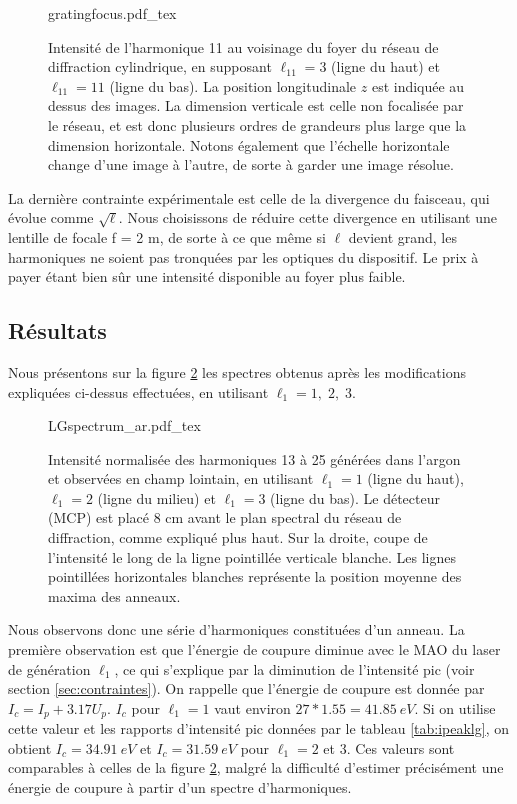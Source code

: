 \begin{figure}[!ht]
\centering
\def\svgwidth{1.1\columnwidth}
{gratingfocus.pdf_tex}
\caption{Intensité de l'harmonique 11 au voisinage du foyer du réseau de diffraction cylindrique, en supposant $\ell_{11} = 3$ (ligne du haut) et $\ell_{11} = 11$ (ligne du bas). La position longitudinale $z$ est indiquée au dessus des images. La dimension verticale est celle non focalisée par le réseau, et est donc plusieurs ordres de grandeurs plus large que la dimension horizontale. Notons également que l'échelle horizontale change d'une image à l'autre, de sorte à garder une image résolue.}
\label{Fig:gratingfocus}
\end{figure}

La dernière contrainte expérimentale est celle de la divergence du faisceau, qui évolue comme $\sqrt{\ell}$. Nous choisissons de réduire cette divergence en utilisant une lentille de focale f = 2 m, de sorte à ce que même si $\ell$ devient grand, les harmoniques ne soient pas tronquées par les optiques du dispositif. Le prix à payer étant bien sûr une intensité disponible au foyer plus faible. 

\subsection{Résultats}
\label{sec:results_lg}
Nous présentons sur la figure \ref{Fig:LGSpectrumAr} les spectres obtenus après les modifications expliquées ci-dessus effectuées, en utilisant $\ell_{1} = 1,\;2,\;3$. 

\begin{figure}[!ht]
\centering
\def\svgwidth{1\columnwidth}
{LGspectrum_ar.pdf_tex}
\caption{Intensité normalisée des harmoniques 13 à 25 générées dans l'argon et observées en champ lointain, en utilisant $\ell_{1} = 1$ (ligne du haut), $\ell_{1} = 2$ (ligne du milieu) et $\ell_{1} = 3$ (ligne du bas). Le détecteur (MCP) est placé 8 cm avant le plan spectral du réseau de diffraction, comme expliqué plus haut. Sur la droite, coupe de l'intensité le long de la ligne pointillée verticale blanche. Les lignes pointillées horizontales blanches représente la position moyenne des maxima des anneaux.}
\label{Fig:LGSpectrumAr}
\end{figure}

Nous observons donc une série d'harmoniques constituées d'un anneau. La première observation est que l'énergie de coupure diminue avec le MAO du laser de génération $\ell_{1}$, ce qui s'explique par la diminution de l'intensité pic (voir section \ref{sec:contraintes}). On rappelle que l'énergie de coupure est donnée par $I_c = I_p+3.17U_p$. $I_c$ pour $\ell_{1} = 1$ vaut environ $27*1.55=\SI{41.85}{eV}$. Si on utilise cette valeur et les rapports d'intensité pic données par le tableau \ref{tab:ipeaklg}, on obtient $I_c=\SI{34.91}{eV}$ et $I_c=\SI{31.59}{eV}$ pour $\ell_{1} = 2$ et 3. Ces valeurs sont comparables à celles de la figure \ref{Fig:LGSpectrumAr}, malgré la difficulté d'estimer précisément une énergie de coupure à partir d'un spectre d'harmoniques. 

